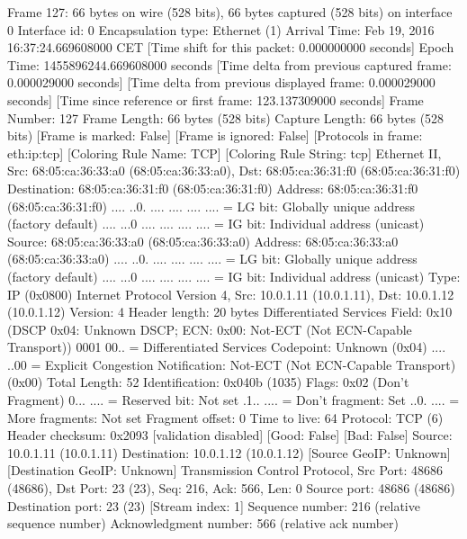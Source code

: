 Frame 127: 66 bytes on wire (528 bits), 66 bytes captured (528 bits) on interface 0
    Interface id: 0
    Encapsulation type: Ethernet (1)
    Arrival Time: Feb 19, 2016 16:37:24.669608000 CET
    [Time shift for this packet: 0.000000000 seconds]
    Epoch Time: 1455896244.669608000 seconds
    [Time delta from previous captured frame: 0.000029000 seconds]
    [Time delta from previous displayed frame: 0.000029000 seconds]
    [Time since reference or first frame: 123.137309000 seconds]
    Frame Number: 127
    Frame Length: 66 bytes (528 bits)
    Capture Length: 66 bytes (528 bits)
    [Frame is marked: False]
    [Frame is ignored: False]
    [Protocols in frame: eth:ip:tcp]
    [Coloring Rule Name: TCP]
    [Coloring Rule String: tcp]
Ethernet II, Src: 68:05:ca:36:33:a0 (68:05:ca:36:33:a0), Dst: 68:05:ca:36:31:f0 (68:05:ca:36:31:f0)
    Destination: 68:05:ca:36:31:f0 (68:05:ca:36:31:f0)
        Address: 68:05:ca:36:31:f0 (68:05:ca:36:31:f0)
        .... ..0. .... .... .... .... = LG bit: Globally unique address (factory default)
        .... ...0 .... .... .... .... = IG bit: Individual address (unicast)
    Source: 68:05:ca:36:33:a0 (68:05:ca:36:33:a0)
        Address: 68:05:ca:36:33:a0 (68:05:ca:36:33:a0)
        .... ..0. .... .... .... .... = LG bit: Globally unique address (factory default)
        .... ...0 .... .... .... .... = IG bit: Individual address (unicast)
    Type: IP (0x0800)
Internet Protocol Version 4, Src: 10.0.1.11 (10.0.1.11), Dst: 10.0.1.12 (10.0.1.12)
    Version: 4
    Header length: 20 bytes
    Differentiated Services Field: 0x10 (DSCP 0x04: Unknown DSCP; ECN: 0x00: Not-ECT (Not ECN-Capable Transport))
        0001 00.. = Differentiated Services Codepoint: Unknown (0x04)
        .... ..00 = Explicit Congestion Notification: Not-ECT (Not ECN-Capable Transport) (0x00)
    Total Length: 52
    Identification: 0x040b (1035)
    Flags: 0x02 (Don't Fragment)
        0... .... = Reserved bit: Not set
        .1.. .... = Don't fragment: Set
        ..0. .... = More fragments: Not set
    Fragment offset: 0
    Time to live: 64
    Protocol: TCP (6)
    Header checksum: 0x2093 [validation disabled]
        [Good: False]
        [Bad: False]
    Source: 10.0.1.11 (10.0.1.11)
    Destination: 10.0.1.12 (10.0.1.12)
    [Source GeoIP: Unknown]
    [Destination GeoIP: Unknown]
Transmission Control Protocol, Src Port: 48686 (48686), Dst Port: 23 (23), Seq: 216, Ack: 566, Len: 0
    Source port: 48686 (48686)
    Destination port: 23 (23)
    [Stream index: 1]
    Sequence number: 216    (relative sequence number)
    Acknowledgment number: 566    (relative ack number)

